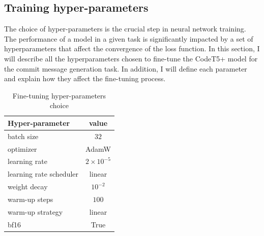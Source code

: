 \subsection{Training hyper-parameters}
The choice of hyper-parameters is the crucial step in neural network training. The performance of a model in a given task is significantly impacted by a set of hyperparameters that affect the convergence of the loss function. In this section, I will describe all the hyperparameters chosen to fine-tune the CodeT5+ model for the commit message generation task. In addition, I will define each parameter and explain how they affect the fine-tuning process.
\setcounter{table}{4}
\begin{table}[h]
    \centering
    \caption{Fine-tuning hyper-parameters choice}\label{tab:ft_hyperparams}
    \renewcommand{\arraystretch}{1.5} %
    \begin{tabular}{| l | c |} %
    \hline %
    \textbf{Hyper-parameter} & \textbf{value} \\
    \hline %
    batch size      & $32$ \\ \hline  
    optimizer       & AdamW \\ \hline  
    learning rate     & $2 \times 10^{-5}$ \\ \hline  
    learning rate scheduler & linear \\ \hline
    weight decay       & $10^{-2}$ \\ \hline  
    warm-up steps & $100$ \\ \hline  
    warm-up strategy & linear \\ \hline
    bf16    & True \\ \hline  
    \end{tabular}
\end{table}
